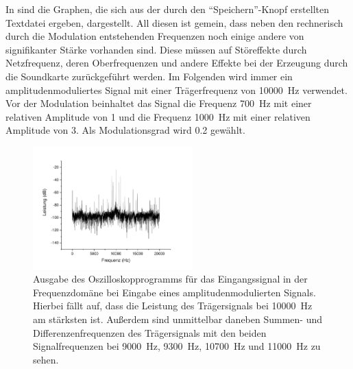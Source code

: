 \documentclass[
a4paper,
12pt,
pagesize,
ngerman
]{scrartcl}
\begin{document}
	In  sind die Graphen, die sich aus der durch den \enquote{Speichern}-Knopf erstellten Textdatei ergeben, dargestellt.
	All diesen ist gemein, dass neben den rechnerisch durch die Modulation entstehenden Frequenzen noch einige andere von signifikanter Stärke vorhanden sind.
	Diese müssen auf Störeffekte durch Netzfrequenz, deren Oberfrequenzen und andere Effekte bei der Erzeugung durch die Soundkarte zurückgeführt werden.
	Im Folgenden wird immer ein amplitudenmoduliertes Signal mit einer Trägerfrequenz von \SI{10000}{\hertz} verwendet.
	Vor der Modulation beinhaltet das Signal die Frequenz \SI{700}{\hertz} mit einer relativen Amplitude von \num{1} und die Frequenz \SI{1000}{\hertz} mit einer relativen Amplitude von \num{3}. %
	Als Modulationsgrad wird \num{0,2} gewählt.

	\begin{figure}[H]  
		\includegraphics[width=0.55\textwidth]{Origin-Files/AM-Demod-Betrag-Eingang}
		\centering
		\caption{Ausgabe des Oszilloskopprogramms für das Eingangssignal in der Frequenzdomäne bei Eingabe eines amplitudenmodulierten Signals.
		Hierbei fällt auf, dass die Leistung des Trägersignals bei \SI{10000}{\hertz} am stärksten ist. Außerdem sind unmittelbar daneben Summen- und Differenzenfrequenzen des Trägersignals mit den beiden Signalfrequenzen bei \SI{9000}{\hertz}, \SI{9300}{\hertz}, \SI{10700}{\hertz} und \SI{11000}{\hertz} zu sehen.
		}
		\label{fig_tag3_am_demod_eingang}
		\centering
	\end{figure}
\end{document}
